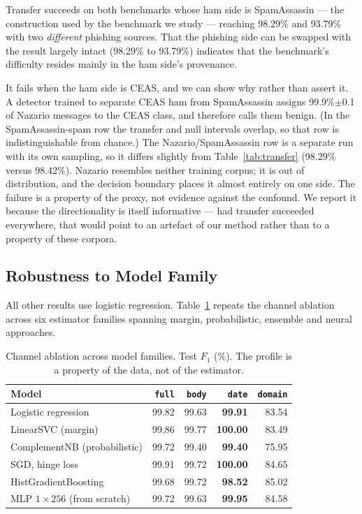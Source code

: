 \documentclass[twoside,11pt]{article}
\newcommand{\gd}[1]{\textbf{#1}}
\begin{document}
Transfer succeeds on both benchmarks whose ham side is SpamAssassin --- the
construction used by the benchmark we study --- reaching
98.29\% and 93.79\% with two \emph{different} phishing sources. That the
phishing side can be swapped with the result largely intact (98.29\% to
93.79\%) indicates that the benchmark's difficulty resides mainly in the ham
side's provenance.

It fails when the ham side is CEAS, and we can show why rather than assert
it. A detector trained to separate CEAS ham from SpamAssassin assigns
99.9\%$\pm$0.1 of Nazario messages to the CEAS class, and therefore calls them
benign. (In the SpamAssassin-spam row the transfer and null intervals overlap,
so that row is indistinguishable from chance.) The Nazario/SpamAssassin row
is a separate run with its own sampling, so it differs slightly from
Table~\ref{tab:transfer} (98.29\% versus 98.42\%). Nazario resembles neither training corpus; it is out of distribution,
and the decision boundary places it almost entirely on one side. The failure
is a property of the proxy, not evidence against the confound. We report it
because the directionality is itself informative --- had transfer succeeded
everywhere, that would point to an artefact of our method rather than to a
property of these corpora.

\subsection{Robustness to Model Family}
\label{sec:families}

All other results use logistic regression. Table~\ref{tab:families} repeats
the channel ablation across six estimator families spanning margin,
probabilistic, ensemble and neural approaches.

\begin{table}[t]
\centering\small
\caption{Channel ablation across model families. Test $F_1$ (\%). The profile
is a property of the data, not of the estimator.}
\label{tab:families}
\begin{tabular}{lrrrr}
\toprule
Model & \texttt{full} & \texttt{body} & \gd{\texttt{date}} & \texttt{domain} \\
\midrule
Logistic regression        & 99.82 & 99.63 & \gd{99.91}  & 83.54 \\
LinearSVC (margin)         & 99.86 & 99.77 & \gd{100.00} & 83.49 \\
ComplementNB (probabilistic)& 99.72 & 99.40 & \gd{99.40}  & 75.95 \\
SGD, hinge loss            & 99.91 & 99.72 & \gd{100.00} & 84.65 \\
HistGradientBoosting       & 99.68 & 99.72 & \gd{98.52}  & 85.02 \\
MLP $1\times256$ (from scratch) & 99.72 & 99.63 & \gd{99.95} & 84.58 \\
\bottomrule
\end{tabular}
\end{table}
\end{document}
